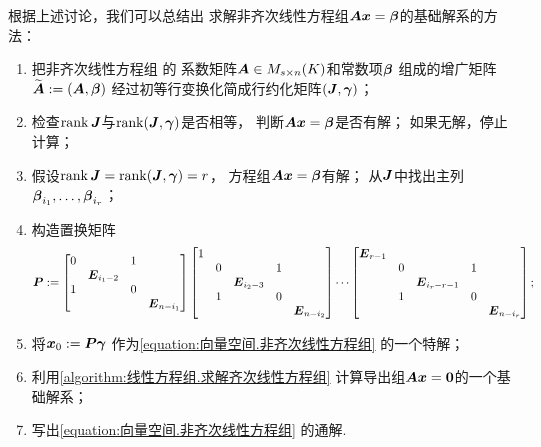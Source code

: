 根据上述讨论，我们可以总结出
求解非齐次线性方程组\(\boldsymbol{A} \boldsymbol{x} = \boldsymbol\beta\)的基础解系的方法：
\begin{algorithm}[求解非齐次线性方程组]
\hfill
\begin{enumerate}
	\item 把非齐次线性方程组  的
	系数矩阵\(\boldsymbol{A} \in M_{s \times n}(K)\)和常数项\(\boldsymbol\beta\)
	组成的增广矩阵\(\widetilde{\boldsymbol{A}} := (\boldsymbol{A},\boldsymbol\beta)\)
	经过初等行变换化简成行约化矩阵\((\boldsymbol{J},\boldsymbol\gamma)\)；

	\item 检查\(\rank\boldsymbol{J}\)与\(\rank(\boldsymbol{J},\boldsymbol\gamma)\)是否相等，
	判断\(\boldsymbol{A} \boldsymbol{x} = \boldsymbol\beta\)是否有解；
	如果无解，停止计算；

	\item 假设\(\rank\boldsymbol{J} = \rank(\boldsymbol{J},\boldsymbol\gamma) = r\)，
	方程组\(\boldsymbol{A} \boldsymbol{x} = \boldsymbol\beta\)有解；
	从\(\boldsymbol{J}\)中找出主列\(\boldsymbol\beta_{i_1},\dotsc,\boldsymbol\beta_{i_r}\)；

	\item 构造置换矩阵\begin{equation*}
		\boldsymbol{P}
		:=
		\begin{bmatrix}
			0 & & 1 \\
			& \boldsymbol{E}_{i_1-2} \\
			1 & & 0 \\
			& & & \boldsymbol{E}_{n-i_1}
		\end{bmatrix}
		\begin{bmatrix}
			1 \\
			& 0 & & 1 \\
			& & \boldsymbol{E}_{i_2-3} \\
			& 1 & & 0 \\
			& & & & \boldsymbol{E}_{n-i_2}
		\end{bmatrix}
		\dotsm
		\begin{bmatrix}
			\boldsymbol{E}_{r-1} \\
			& 0 & & 1 \\
			& & \boldsymbol{E}_{i_r-r-1} \\
			& 1 & & 0 \\
			& & & & \boldsymbol{E}_{n-i_r}
		\end{bmatrix};
	\end{equation*}

	\item
	将\(\boldsymbol{x}_0 := \boldsymbol{P} \boldsymbol\gamma\)
	作为\cref{equation:向量空间.非齐次线性方程组} 的一个特解；

	\item 利用\cref{algorithm:线性方程组.求解齐次线性方程组}
	计算导出组\(\boldsymbol{A} \boldsymbol{x} = \boldsymbol0\)的一个基础解系；

	\item 写出\cref{equation:向量空间.非齐次线性方程组} 的通解.
\end{enumerate}
\end{algorithm}

